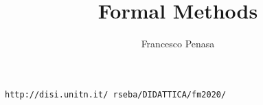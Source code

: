 \documentclass[11pt]{article}
\begin{document}
\author{Francesco Penasa}
\title{Formal Methods}
\maketitle

\medskip

\texttt{http://disi.unitn.it/~rseba/DIDATTICA/fm2020/}\\
\end{document}
